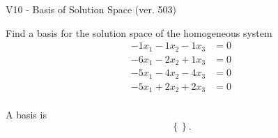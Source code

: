 \begin{exercise}
  \begin{exerciseTitle}V10 - Basis of Solution Space (ver. 503)\end{exerciseTitle}
  \begin{exerciseStatement}
    Find a basis for the solution space of the homogeneous system 
\begin{align*}
 -1 x_ 1 -1 x_ 2 -1 x_ 3 &= 0  \\ 
  -6 x_ 1 -2 x_ 2 + 1 x_ 3 &= 0  \\ 
  -5 x_ 1 -4 x_ 2 -4 x_ 3 &= 0  \\ 
  -5 x_ 1 + 2 x_ 2 + 2 x_ 3 &= 0  \\ 
 \end{align*}


 
  \end{exerciseStatement}

  \begin{exerciseAnswer}
   A basis is   
\[\left\{\right\}.\]

  


  \end{exerciseAnswer}
\end{exercise}